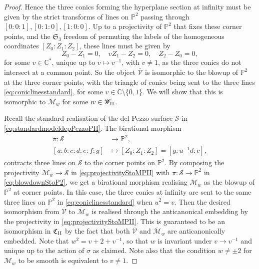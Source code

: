 \documentclass[a4paper,reqno]{amsart}
\numberwithin{equation}{section}
\newcommand{\C}{\mathbb{C}}
\newcommand{\p}{\mathbb{P}}
\numberwithin{equation}{section}
\begin{document}
\begin{proof}
    Hence the three conics forming the hyperplane section at infinity must be given by the strict transforms of lines on $\p^2$ passing through  $[0:0:1],[0:1:0],[1:0:0]$.
    Up to a projectivity of $\p^2$ that fixes these corner points, and the $\mathfrak{S}_3$ freedom of permuting the labels of the homogeneous coordinates $[Z_0:Z_1:Z_2]$,  these lines must be given by 
    \begin{equation} \label{eq:coniclinesstandard}
        Z_0-Z_1 = 0, \quad v Z_1 -  Z_2 =0, \quad Z_2-Z_0=0,
    \end{equation}
    for some $v\in \C^*$, unique up to $v\mapsto v^{-1}$, with $v\neq 1$, as the three conics do not intersect at a common point.
    So the object $\overline{\mathcal{V}}$ is isomorphic to the blowup of $\p^2$ at the three corner points, with the triangle of conics being sent to the three lines \eqref{eq:coniclinesstandard}, for some $v\in \C\setminus\{0,1\}$.
    We will show that this is isomorphic to $\overline{\mathcal{M}}_w$ for some $w\in \mathscr{W}_{\rm{II}}$.
    
    Recall the standard realisation of the del Pezzo surface $\overline{\mathcal{S}}$ in \eqref{eq:standardmodeldepPezzoPII}.
    The birational morphism 
    \begin{equation} \label{eq:blowdownStoP2}
    \begin{aligned}
        \pi : \overline{\mathcal{S}} &\to \p^2, \\
        [a:b:c:d:e:f:g] &\mapsto [Z_0:Z_1:Z_2] = [g : u^{-1} d : c], 
    \end{aligned}
    \end{equation} 
    contracts three lines on $\overline{\mathcal{S}}$ to the corner points on $\p^2$.
    By composing the projectivity $\overline{\mathcal{M}}_w\to \overline{\mathcal{S}}$ in \cref{eq:projectivityStoMPII} with $\pi : \overline{\mathcal{S}}\to\p^2$ in \eqref{eq:blowdownStoP2}, we get a birational morphism 
    realising $\overline{\mathcal{M}}_w$ as the blowup of $\p^2$ at corner points.
    In this case, the three conics at infinity are sent to the same three lines on $\p^2$ in \eqref{eq:coniclinesstandard} when $u^2=v$. 
    Then the desired isomorphism  from $\overline{\mathcal{V}}$  to $\overline{\mathcal{M}}_w$ is realised through the anticanonical embedding by the projectivity in \cref{eq:projectivityStoMPII}.
    This is guaranteed to be an isomorphism in $\mathfrak{C}_{\rm{II}}$ by the fact that both $\overline{\mathcal{V}}$ and $\overline{\mathcal{M}}_w$ are anticanonically embedded. Note that $w^2 = v+ 2 + v^{-1}$, so that
     $w$ is invariant under $v\to v^{-1}$ and unique up to the action of $\sigma$ as claimed.
    Note also that the condition $w \neq \pm 2$ for $\mathcal{M}_w$ to be smooth is equivalent to $v\neq 1$.



\end{proof}
\end{document}
